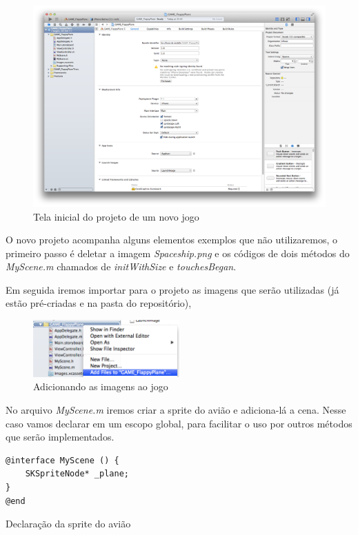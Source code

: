 \documentclass[a4paper,12pt,brazil,oneside]{book}
\begin{document}
\begin{figure}[H]
  \centering
  \includegraphics[width=1\textwidth]{figuras/6/plane2.png}
  \caption{Tela inicial do projeto de um novo jogo}
  \label{fig:a}
\end{figure}

O novo projeto acompanha alguns elementos exemplos que não utilizaremos, o primeiro passo é deletar a imagem \emph{Spaceship.png} e os códigos de dois métodos do \emph{MyScene.m} chamados de \emph{initWithSize} e \emph{touchesBegan}.

Em seguida iremos importar para o projeto as imagens que serão utilizadas (já estão pré-criadas e na pasta do repositório),

\begin{figure}[H]
  \centering
  \includegraphics[width=0.5\textwidth]{figuras/6/plane3.png}
  \caption{Adicionando as imagens ao jogo}
  \label{fig:a}
\end{figure}

No arquivo \emph{MyScene.m} iremos criar a sprite do avião e adiciona-lá a cena.
Nesse caso vamos declarar em um escopo global, para facilitar o uso por outros métodos que serão implementados.

\begin{listing}[H]
\begin{verbatim}
@interface MyScene () {
    SKSpriteNode* _plane;
}
@end
\end{verbatim}
\caption{Declaração da sprite do avião}
\end{listing}
\end{document}
